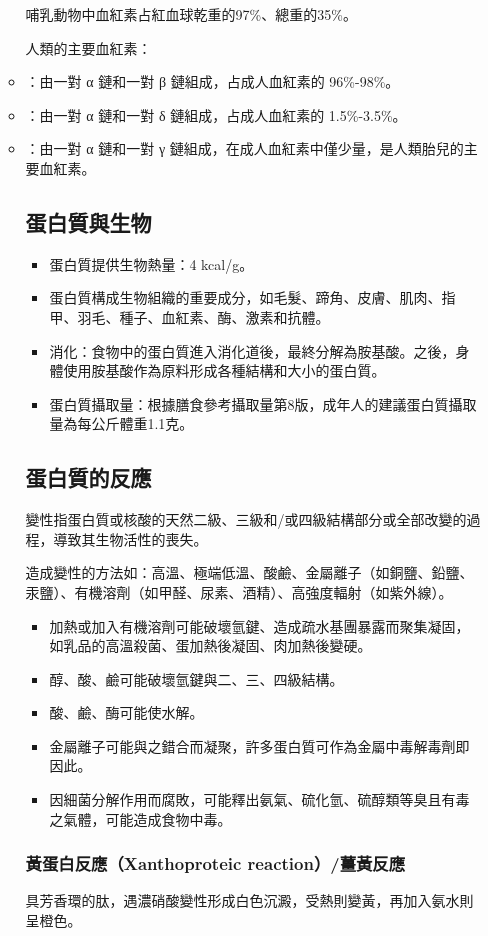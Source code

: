 \documentclass[a4paper,12pt]{report}
\begin{document}
\begin{itemize}
\begin{itemize}
哺乳動物中血紅素占紅血球乾重的97\%、總重的35\%。

人類的主要血紅素：
\bit
\item {}：由一對 α 鏈和一對 β 鏈組成，占成人血紅素的 96\%-98\%。
\item {}：由一對 α 鏈和一對 δ 鏈組成，占成人血紅素的 1.5\%-3.5\%。
\item {}：由一對 α 鏈和一對 γ 鏈組成，在成人血紅素中僅少量，是人類胎兒的主要血紅素。 
\eit
\subsection{蛋白質與生物}
\begin{itemize}
\item 蛋白質提供生物熱量：4 kcal/g。
\item 蛋白質構成生物組織的重要成分，如毛髮、蹄角、皮膚、肌肉、指甲、羽毛、種子、血紅素、酶、激素和抗體。
\item 消化：食物中的蛋白質進入消化道後，最終分解為胺基酸。之後，身體使用胺基酸作為原料形成各種結構和大小的蛋白質。
\item 蛋白質攝取量：根據膳食參考攝取量第8版，成年人的建議蛋白質攝取量為每公斤體重1.1克。
\end{itemize}
\subsection{蛋白質的反應}
變性指蛋白質或核酸的天然二級、三級和/或四級結構部分或全部改變的過程，導致其生物活性的喪失。

造成變性的方法如：高溫、極端低溫、酸鹼、金屬離子（如銅鹽、鉛鹽、汞鹽）、有機溶劑（如甲醛、尿素、酒精）、高強度輻射（如紫外線）。
\begin{itemize}
\item 加熱或加入有機溶劑可能破壞氫鍵、造成疏水基團暴露而聚集凝固，如乳品的高溫殺菌、蛋加熱後凝固、肉加熱後變硬。
\item 醇、酸、鹼可能破壞氫鍵與二、三、四級結構。
\item 酸、鹼、酶可能使水解。
\item 金屬離子可能與之錯合而凝聚，許多蛋白質可作為金屬中毒解毒劑即因此。
\item 因細菌分解作用而腐敗，可能釋出氨氣、硫化氫、硫醇類等臭且有毒之氣體，可能造成食物中毒。
\end{itemize}
\subsubsection{黃蛋白反應（Xanthoproteic reaction）/薑黃反應}
具芳香環的肽，遇濃硝酸變性形成白色沉澱，受熱則變黃，再加入氨水則呈橙色。

\end{itemize}
\end{itemize}
\end{document}

